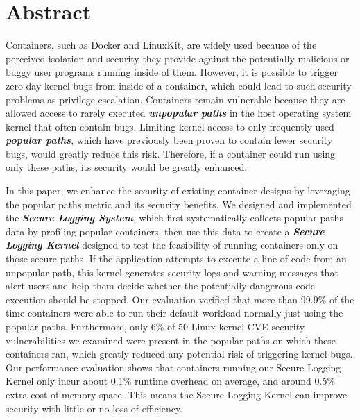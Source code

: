 \section*{Abstract}
Containers, such as Docker and LinuxKit, are widely used because of the perceived isolation and security 
they provide against the potentially malicious or buggy user programs running inside of them. 
However, it is possible to trigger zero-day kernel bugs from inside of a container, which could lead to such security problems as privilege escalation. 
Containers remain vulnerable because they are allowed access to rarely executed \textbf{\textit{unpopular paths}} in the host operating system kernel that often contain bugs. 
Limiting kernel access to only frequently used \textbf{\textit{popular paths}}, which have previously been proven to contain fewer security bugs, would greatly reduce this risk. 
Therefore, if a container could run using only these paths, its security would be greatly enhanced. 

In this paper, we enhance the security of existing container designs by leveraging the popular paths metric and its security benefits. 
We designed and implemented the \textbf{\textit{Secure Logging System}}, which first systematically collects popular paths data by profiling popular containers, 
then use this data to create a \textbf{\textit{Secure Logging Kernel}} designed to test the feasibility of running containers only on those secure paths. 
If the application attempts to execute a line of code from an unpopular path, this kernel generates security logs and warning messages that alert users 
and help them decide whether the potentially dangerous code execution should be stopped. 
Our evaluation verified that more than 99.9\% of the time containers were able to run their default workload normally just using the popular paths. 
Furthermore, only 6\% of 50 Linux kernel CVE security vulnerabilities we examined were present in the popular paths on which these containers ran, 
which greatly reduced any potential risk of triggering kernel bugs. Our performance evaluation shows that 
containers running our Secure Logging Kernel only incur about 0.1\% runtime overhead on average, and around 0.5\% extra cost of memory space. 
This means the Secure Logging Kernel can improve security with little or no loss of efficiency. 